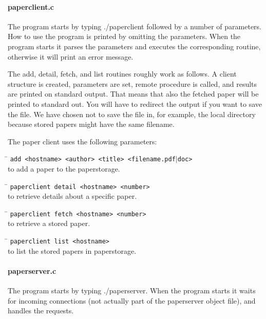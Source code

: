 \documentclass[a4paper,10pt]{article}
\begin{document}
\paragraph{paperclient.c}
The program starts by typing ./paperclient followed by a number of parameters. How to use the program is printed by omitting the parameters. When the program starts it parses the parameters and executes the corresponding routine, otherwise it will print an error message.

The add, detail, fetch, and list routines roughly work as follows. A client structure is created, parameters are set, remote procedure is called, and results are printed on standard output. That means that also the fetched paper will be printed to standard out. You will have to redirect the output if you want to save the file. We have chosen not to save the file in, for example, the local directory because stored papers might have the same filename.

The paper client uses the following parameters:

\begin{tabbing}
\hspace{20pt}\=\kill
 \> \texttt{add <hostname> <author> <title> <filename.}{\texttt{pdf$\vert$doc}}\texttt{>} \\
 \> to add a paper to the paperstorage.
\end{tabbing}

\begin{tabbing}
\hspace{20pt}\=\kill
 \> \texttt{paperclient detail <hostname> <number>} \\
 \> to retrieve details about a specific paper.
\end{tabbing}

\begin{tabbing}
\hspace{20pt}\=\kill
 \> \texttt{paperclient fetch <hostname> <number>} \\
 \> to retrieve a stored paper.
\end{tabbing}

\begin{tabbing}
\hspace{20pt}\=\kill
 \> \texttt{paperclient list <hostname>} \\
 \> to list the stored papers in paperstorage.
\end{tabbing}

\paragraph{paperserver.c}
The program starts by typing ./paperserver. When the program starts it waits for incoming connections (not actually part of the paperserver object file), and handles the requests.
\end{document}
